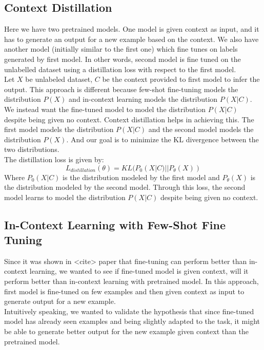 \documentclass[10pt,twocolumn,letterpaper]{article}
\begin{document}
\subsection{Context Distillation}
Here we have two pretrained models. One model is given context as input, and it has to generate an output for a new example based on the context.
We also have another model (initially similar to the first one) which fine tunes on labels generated by first model.
In other words, second model is fine tuned on the unlabelled dataset using a distillation loss with respect to the first model.\\
Let $X$ be unlabeled dataset, $C$ be the context provided to first model to infer the output. This approach is different because few-shot 
fine-tuning models the distribution $P(X)$ and in-context learning models the distribution $P(X|C)$.
We instead want the fine-tuned model to model the distribution $P(X|C)$ despite being given no context. Context distillation helps in achieving this.
The first model models the distribution $P(X|C)$ and the second model models the distribution $P(X)$.
And our goal is to minimize the KL divergence between the two distributions.\\
The distillation loss is given by:
\begin{equation}
	L_{distillation}(\theta) = KL(P_0(X|C) || P_{\theta}(X))
\end{equation}
Where $P_0(X|C)$ is the distribution modeled by the first model and $P_{\theta}(X)$ is the distribution modeled by the second model. Through this
loss, the second model learns to model the distribution $P(X|C)$ despite being given no context.

\subsection{In-Context Learning with Few-Shot Fine Tuning}
Since it was shown in <cite> paper that fine-tuning can perform better than in-context learning, we wanted to see if fine-tuned model is given context,
will it perform better than in-context learning with pretrained model.
In this approach, first model is fine-tuned on few examples and then given context as input to generate output for a new example.\\
Intuitively speaking, we wanted to validate the hypothesis that since fine-tuned model has already seen examples and being slightly adapted to the task, it might be able to generate better output
for the new example given context than the pretrained model.
\end{document}
